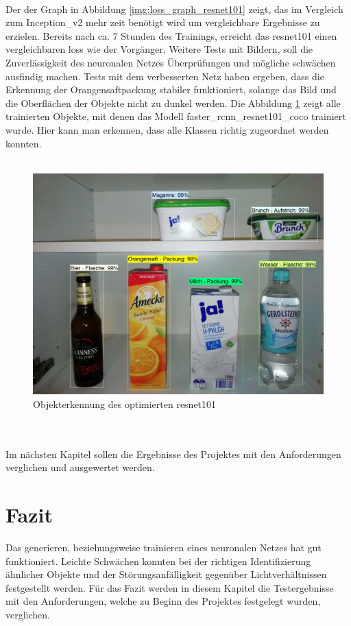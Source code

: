 \documentclass[a4paper,12pt,oneside]{article}
\begin{document}
\\
Der der Graph in Abbildung \ref{img:loss_graph_resnet101} zeigt, das im Vergleich zum Inception\_v2 mehr zeit benötigt wird um vergleichbare Ergebnisse zu erzielen. Bereits nach ca. 7 Stunden des Trainings, erreicht das resnet101  einen vergleichbaren \glqq loss\grqq{} wie der Vorgänger. Weitere Tests mit Bildern, soll die Zuverlässigkeit des neuronalen Netzes Überprüfungen und mögliche schwächen ausfindig machen.
Tests mit dem verbesserten Netz haben ergeben, dass die Erkennung der Orangensaftpackung stabiler funktioniert, solange das Bild und die Oberflächen der Objekte nicht zu dunkel werden. Die Abbildung \ref{img:resnet101_test} zeigt alle trainierten Objekte, mit denen das Modell faster\_rcnn\_resnet101\_coco trainiert wurde. Hier kann man erkennen, dass alle Klassen richtig zugeordnet werden konnten.\\\\
\begin{figure}
    [h]
	\centering
	\includegraphics[scale=0.4]{Sources/final_detection.jpg}
	\vspace{0.3 cm}
	\caption{Objekterkennung des optimierten resnet101}
	\label{img:resnet101_test}
\end{figure}\\\\
Im nächsten Kapitel sollen die Ergebnisse des Projektes mit den Anforderungen verglichen und ausgewertet werden.

\newpage

\section{Fazit}
Das generieren, beziehungsweise trainieren eines neuronalen Netzes hat gut funktioniert. Leichte Schwächen konnten bei der richtigen Identifizierung ähnlicher Objekte und der Störungsanfälligkeit gegenüber Lichtverhältnissen festgestellt werden. Für das Fazit werden in diesem Kapitel die Testergebnisse mit den Anforderungen, welche zu Beginn des Projektes festgelegt wurden, verglichen.
\end{document}
